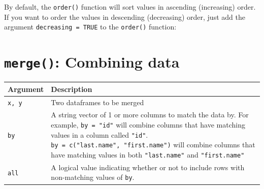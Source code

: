 \documentclass[]{book}
\newenvironment{Shaded}{\begin{snugshade}}{\end{snugshade}}
\newcommand{\KeywordTok}[1]{\textcolor[rgb]{0.13,0.29,0.53}{\textbf{{#1}}}}
\newcommand{\DataTypeTok}[1]{\textcolor[rgb]{0.13,0.29,0.53}{{#1}}}
\newcommand{\StringTok}[1]{\textcolor[rgb]{0.31,0.60,0.02}{{#1}}}
\newcommand{\CommentTok}[1]{\textcolor[rgb]{0.56,0.35,0.01}{\textit{{#1}}}}
\newcommand{\OtherTok}[1]{\textcolor[rgb]{0.56,0.35,0.01}{{#1}}}
\newcommand{\NormalTok}[1]{{#1}}
\theoremstyle{definition}
\theoremstyle{definition}
\theoremstyle{remark}
\begin{document}
By default, the \texttt{order()} function will sort values in ascending
(increasing) order. If you want to order the values in descending
(decreasing) order, just add the argument \texttt{decreasing\ =\ TRUE}
to the \texttt{order()} function:

\begin{Shaded}
\end{Shaded}

\section{\texorpdfstring{\texttt{merge()}: Combining
data}{merge(): Combining data}}\label{merge-combining-data}

\begin{longtable}[]{@{}ll@{}}
\toprule
\begin{minipage}[b]{0.18\columnwidth}\raggedright\strut
Argument\strut
\end{minipage} & \begin{minipage}[b]{0.67\columnwidth}\raggedright\strut
Description\strut
\end{minipage}\tabularnewline
\midrule
\endhead
\begin{minipage}[t]{0.18\columnwidth}\raggedright\strut
\texttt{x,\ y}\strut
\end{minipage} & \begin{minipage}[t]{0.67\columnwidth}\raggedright\strut
Two dataframes to be merged\strut
\end{minipage}\tabularnewline
\begin{minipage}[t]{0.18\columnwidth}\raggedright\strut
\texttt{by}\strut
\end{minipage} & \begin{minipage}[t]{0.67\columnwidth}\raggedright\strut
A string vector of 1 or more columns to match the data by. For example,
\texttt{by\ =\ "id"} will combine columns that have matching values in a
column called \texttt{"id"}.
\texttt{by\ =\ c("last.name",\ "first.name")} will combine columns that
have matching values in both \texttt{"last.name"} and
\texttt{"first.name"}\strut
\end{minipage}\tabularnewline
\begin{minipage}[t]{0.18\columnwidth}\raggedright\strut
\texttt{all}\strut
\end{minipage} & \begin{minipage}[t]{0.67\columnwidth}\raggedright\strut
A logical value indicating whether or not to include rows with
non-matching values of \texttt{by}.\strut
\end{minipage}\tabularnewline
\bottomrule
\end{longtable}
\end{document}
